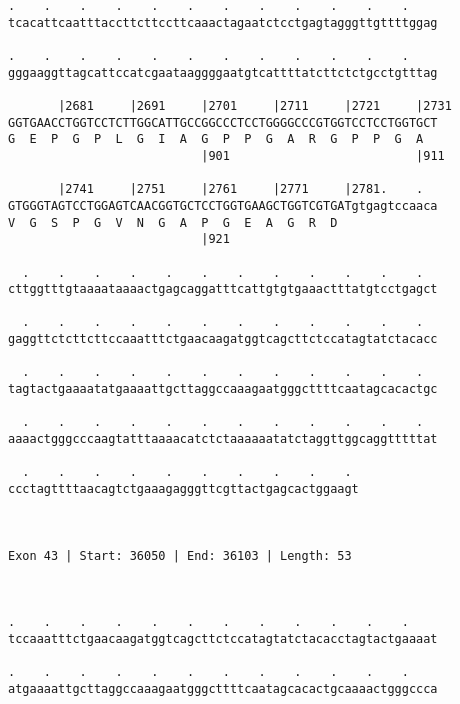 \documentclass{article}
\begin{document}
\begin{Verbatim}
.    .    .    .    .    .    .    .    .    .    .    .    
tcacattcaatttaccttcttccttcaaactagaatctcctgagtagggttgttttggag
                                                            
.    .    .    .    .    .    .    .    .    .    .    .    
gggaaggttagcattccatcgaataaggggaatgtcattttatcttctctgcctgtttag
                                                            
       |2681     |2691     |2701     |2711     |2721     |2731
GGTGAACCTGGTCCTCTTGGCATTGCCGGCCCTCCTGGGGCCCGTGGTCCTCCTGGTGCT
G  E  P  G  P  L  G  I  A  G  P  P  G  A  R  G  P  P  G  A  
                           |901                          |911
  
       |2741     |2751     |2761     |2771     |2781.    .  
GTGGGTAGTCCTGGAGTCAACGGTGCTCCTGGTGAAGCTGGTCGTGATgtgagtccaaca
V  G  S  P  G  V  N  G  A  P  G  E  A  G  R  D              
                           |921                             
  
  .    .    .    .    .    .    .    .    .    .    .    .  
cttggtttgtaaaataaaactgagcaggatttcattgtgtgaaactttatgtcctgagct
                                                            
  .    .    .    .    .    .    .    .    .    .    .    .  
gaggttctcttcttccaaatttctgaacaagatggtcagcttctccatagtatctacacc
                                                            
  .    .    .    .    .    .    .    .    .    .    .    .  
tagtactgaaaatatgaaaattgcttaggccaaagaatgggcttttcaatagcacactgc
                                                            
  .    .    .    .    .    .    .    .    .    .    .    .  
aaaactgggcccaagtatttaaaacatctctaaaaaatatctaggttggcaggtttttat
                                                            
  .    .    .    .    .    .    .    .    .    . 
ccctagttttaacagtctgaaagagggttcgttactgagcactggaagt
                                                 
                                                 
 
Exon 43 | Start: 36050 | End: 36103 | Length: 53



.    .    .    .    .    .    .    .    .    .    .    .    
tccaaatttctgaacaagatggtcagcttctccatagtatctacacctagtactgaaaat
                                                            
.    .    .    .    .    .    .    .    .    .    .    .    
atgaaaattgcttaggccaaagaatgggcttttcaatagcacactgcaaaactgggccca
                                                            

\end{Verbatim}
\end{document}
